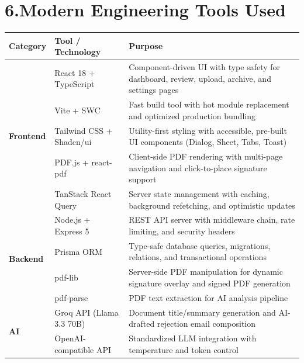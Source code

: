 \documentclass[12pt,a4paper]{report}
\begin{document}
\chapter*{6.\quad Modern Engineering Tools Used}

\vspace{0.5cm}

\renewcommand{\arraystretch}{1.3}

\begin{table}[h!]
\small
\centering
\begin{tabularx}{\textwidth}{|p{2.2cm}|p{4cm}|X|}
\hline
\rowcolor{gray!20}
\textbf{Category} & \textbf{Tool / Technology} & \textbf{Purpose} \\
\hline

\multirow{5}{*}{\textbf{Frontend}}
& React 18 + TypeScript
& Component-driven UI with type safety for dashboard, review, upload, archive, and settings pages \\
\cline{2-3}
& Vite + SWC
& Fast build tool with hot module replacement and optimized production bundling \\
\cline{2-3}
& Tailwind CSS + Shadcn/ui
& Utility-first styling with accessible, pre-built UI components (Dialog, Sheet, Tabs, Toast) \\
\cline{2-3}
& PDF.js + react-pdf
& Client-side PDF rendering with multi-page navigation and click-to-place signature support \\
\cline{2-3}
& TanStack React Query
& Server state management with caching, background refetching, and optimistic updates \\
\hline

\multirow{4}{*}{\textbf{Backend}}
& Node.js + Express 5
& REST API server with middleware chain, rate limiting, and security headers \\
\cline{2-3}
& Prisma ORM
& Type-safe database queries, migrations, relations, and transactional operations \\
\cline{2-3}
& pdf-lib
& Server-side PDF manipulation for dynamic signature overlay and signed PDF generation \\
\cline{2-3}
& pdf-parse
& PDF text extraction for AI analysis pipeline \\
\hline

\multirow{2}{*}{\textbf{AI}}
& Groq API (Llama 3.3 70B)
& Document title/summary generation and AI-drafted rejection email composition \\
\cline{2-3}
& OpenAI-compatible API
& Standardized LLM integration with temperature and token control \\
\hline


\end{tabularx}
\end{table}
\end{document}
